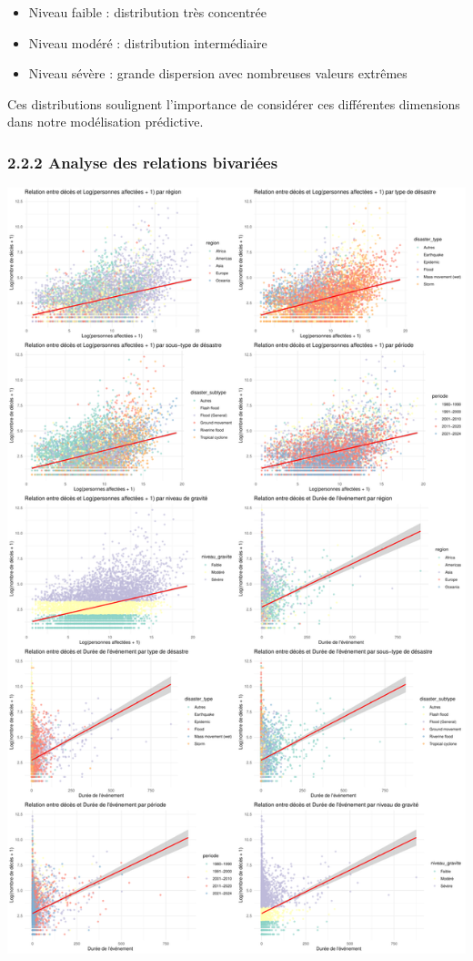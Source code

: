 \documentclass[
]{article}
\providecommand{\tightlist}{%
  \setlength{\itemsep}{0pt}\setlength{\parskip}{0pt}}
\begin{document}
\begin{itemize}
\tightlist
\item
  Niveau faible : distribution très concentrée
\item
  Niveau modéré : distribution intermédiaire
\item
  Niveau sévère : grande dispersion avec nombreuses valeurs extrêmes
\end{itemize}

Ces distributions soulignent l'importance de considérer ces différentes
dimensions dans notre modélisation prédictive.

\subsubsection{2.2.2 Analyse des relations
bivariées}\label{analyse-des-relations-bivariuxe9es}

\includegraphics{Projet_ML_files/figure-latex/bivariate_analysis-1.pdf}
\end{document}
